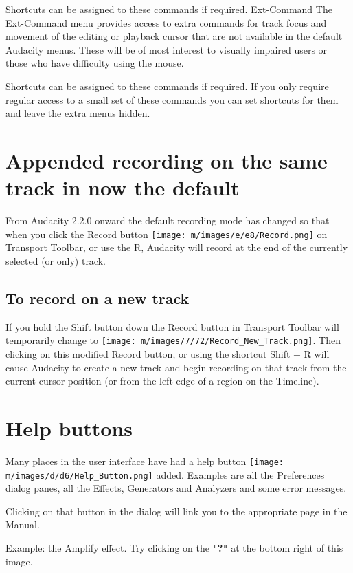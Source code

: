 Shortcuts can be assigned to these commands if required.
Ext-Command
The Ext-Command menu provides access to extra commands for track focus and movement of the editing or playback cursor that are not available in the default Audacity menus. These will be of most interest to visually impaired users or those who have difficulty using the mouse.

Shortcuts can be assigned to these commands if required.
If you only require regular access to a small set of these commands you can set shortcuts for them and leave the extra menus hidden.


\section{Appended recording on the same track in now the default}


From Audacity 2.2.0 onward the default recording mode has changed so that when you click the Record button \texttt{[image: m/images/e/e8/Record.png]} on Transport Toolbar, or use the R, Audacity will record at the end of the currently selected (or only) track.

\subsection{To record on a new track}


If you hold the Shift button down the Record button in Transport Toolbar will temporarily change to \texttt{[image: m/images/7/72/Record\_New\_Track.png]}. Then clicking on this modified Record button, or using the shortcut Shift + R will cause Audacity to create a new track and begin recording on that track from the current cursor position (or from the left edge of a region on the Timeline). 


\section{Help buttons}


Many places in the user interface have had a help button \texttt{[image: m/images/d/d6/Help\_Button.png]} added. Examples are all the Preferences dialog panes, all the Effects, Generators and Analyzers and some error messages.

Clicking on that button in the dialog will link you to the appropriate page in the Manual.

Example: the Amplify effect.  Try clicking on the \texttt{{}"{}}\textbf{?}\texttt{{}"{}} at the bottom right of this image.

